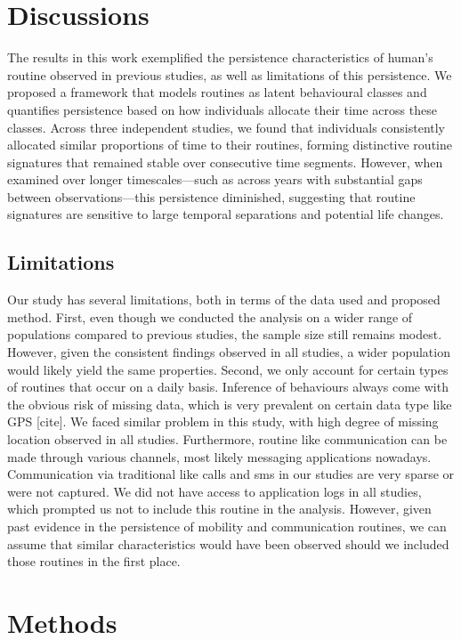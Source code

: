 \documentclass[pdflatex,sn-vancouver,Numbered]{bst/sn-jnl}%
\theoremstyle{thmstyleone}%
\theoremstyle{thmstyletwo}%
\theoremstyle{thmstylethree}%
\begin{document}
\section*{Discussions}\label{sec4}  

The results in this work exemplified the persistence characteristics of human's routine observed in previous studies, as well as limitations of this persistence. We proposed a framework that models routines as latent behavioural classes and quantifies persistence based on how individuals allocate their time across these classes. Across three independent studies, we found that individuals consistently allocated similar proportions of time to their routines, forming distinctive routine signatures that remained stable over consecutive time segments. However, when examined over longer timescales—such as across years with substantial gaps between observations—this persistence diminished, suggesting that routine signatures are sensitive to large temporal separations and potential life changes.


\subsection*{Limitations}\label{sec4.2}  

Our study has several limitations, both in terms of the data used and proposed method. First, even though we conducted the analysis on a wider range of populations compared to previous studies, the sample size still remains modest. However, given the consistent findings observed in all studies, a wider population would likely yield the same properties. Second, we only account for certain types of routines that occur on a daily basis. Inference of behaviours always come with the obvious risk of missing data, which is very prevalent on certain data type like GPS [cite]. We faced similar problem in this study, with high degree of missing location observed in all studies. Furthermore, routine like communication can be made through various channels, most likely messaging applications nowadays. Communication via traditional like calls and sms in our studies are very sparse or were not captured. We did not have access to application logs in all studies, which prompted us not to include this routine in the analysis. However, given past evidence in the persistence of mobility and communication routines, we can assume that similar characteristics would have been observed should we included those routines in the first place.

\section*{Methods}\label{sec:methods}  
\end{document}
